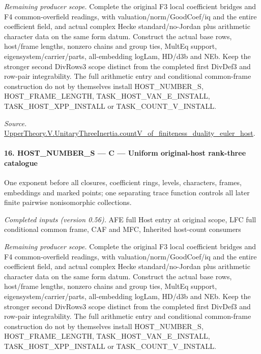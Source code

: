 \emph{Remaining producer scope.} Complete the original F3 local coefficient bridges and F4 common-overfield readings, with valuation/norm/GoodCoef/iq and the entire coefficient field, and actual complex Hecke standard/no-Jordan plus arithmetic character data on the same form datum. Construct the actual base rows, host/frame lengths, nonzero chains and group ties, MultEq support, eigensystem/carrier/parts, all-embedding logLam, HD/d3b and NEb. Keep the stronger second DivRows3 scope distinct from the completed first DivDef3 and row-pair integrability. The full arithmetic entry and conditional common-frame construction do not by themselves install HOST\_\allowbreak NUMBER\_\allowbreak S, HOST\_\allowbreak FRAME\_\allowbreak LENGTH, TASK\_\allowbreak HOST\_\allowbreak VAN\_\allowbreak E\_\allowbreak INSTALL, TASK\_\allowbreak HOST\_\allowbreak XPP\_\allowbreak INSTALL or TASK\_\allowbreak COUNT\_\allowbreak V\_\allowbreak INSTALL.

\emph{Source.} \href{https://github.com/CocoSgt/riemann-hypothesis-lean/blob/7cbf7a0c32fca1badf05931879a37c3f8a2b03b4/src/Development/AutomorphicArithmetic/AutomorphicVarieties/ModularityArgument/ThresholdArguments/DenseThresholdCases/CountVOf.lean#L33-L60}{UpperTheory.V.UnitaryThreeInertia.countV\_\allowbreak of\_\allowbreak finiteness\_\allowbreak duality\_\allowbreak euler\_\allowbreak host}.



\paragraph{16. HOST\_\allowbreak NUMBER\_\allowbreak S — C — Uniform original-host rank-three catalogue}

One exponent before all closures, coefficient rings, levels, characters, frames, embeddings and marked points; one separating trace function controls all later finite pairwise nonisomorphic collections.

\emph{Completed inputs (version 0.56).} AFE full Host entry at original scope, LFC full conditional common frame, CAF and MFC, Inherited host-count consumers

\emph{Remaining producer scope.} Complete the original F3 local coefficient bridges and F4 common-overfield readings, with valuation/norm/GoodCoef/iq and the entire coefficient field, and actual complex Hecke standard/no-Jordan plus arithmetic character data on the same form datum. Construct the actual base rows, host/frame lengths, nonzero chains and group ties, MultEq support, eigensystem/carrier/parts, all-embedding logLam, HD/d3b and NEb. Keep the stronger second DivRows3 scope distinct from the completed first DivDef3 and row-pair integrability. The full arithmetic entry and conditional common-frame construction do not by themselves install HOST\_\allowbreak NUMBER\_\allowbreak S, HOST\_\allowbreak FRAME\_\allowbreak LENGTH, TASK\_\allowbreak HOST\_\allowbreak VAN\_\allowbreak E\_\allowbreak INSTALL, TASK\_\allowbreak HOST\_\allowbreak XPP\_\allowbreak INSTALL or TASK\_\allowbreak COUNT\_\allowbreak V\_\allowbreak INSTALL.

